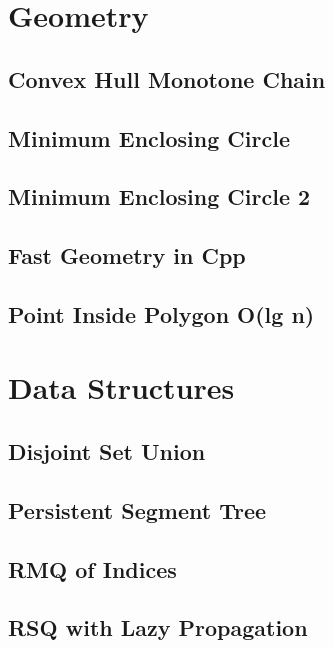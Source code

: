 \section{Geometry}
\subsection{Convex Hull Monotone Chain}
\raggedbottom
\hrulefill
\subsection{Minimum Enclosing Circle}
\raggedbottom
\hrulefill
\subsection{Minimum Enclosing Circle 2}
\raggedbottom
\hrulefill
\subsection{Fast Geometry in Cpp}
\raggedbottom
\hrulefill
\subsection{Point Inside Polygon O(lg n)}
\raggedbottom
\hrulefill

\section{Data Structures}
\subsection{Disjoint Set Union}
\raggedbottom
\hrulefill
\subsection{Persistent Segment Tree}
\raggedbottom
\hrulefill
\subsection{RMQ of Indices}
\raggedbottom
\hrulefill
\subsection{RSQ with Lazy Propagation}
\raggedbottom
\hrulefill

